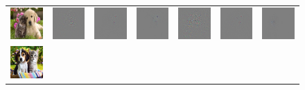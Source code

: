\setlength{\tabcolsep}{2pt}
\begin{figure}
\begin{center}
\begin{tabular}{c||ccc||ccc}
\includegraphics[width=0.13\linewidth]{figs/examples/googlenet/oxford/dog-cat1} &
\includegraphics[width=0.13\linewidth]{figs/examples/googlenet/oxford/dog-cat1_diff_258} &
\includegraphics[width=0.13\linewidth]{figs/examples/googlenet/deconv/dog-cat1_diff_258} &
\includegraphics[width=0.13\linewidth]{figs/examples/googlenet/soft/dog-cat1_diff_258} &
\includegraphics[width=0.13\linewidth]{figs/examples/googlenet/oxford/dog-cat1_diff_286} &
\includegraphics[width=0.13\linewidth]{figs/examples/googlenet/deconv/dog-cat1_diff_286} &
\includegraphics[width=0.13\linewidth]{figs/examples/googlenet/soft/dog-cat1_diff_286} \\
\includegraphics[width=0.13\linewidth]{figs/examples/googlenet/oxford/dog-cat2} &

\end{tabular}
\end{center}
\end{figure}

